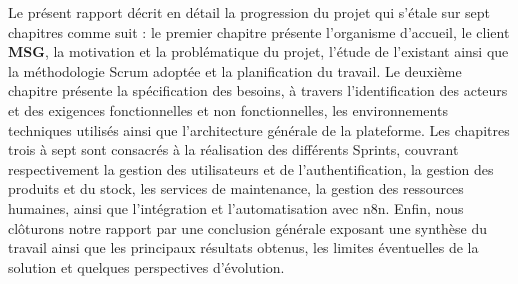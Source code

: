 Le présent rapport décrit en détail la progression du projet qui s'étale sur sept chapitres comme suit : le premier chapitre présente l'organisme d'accueil, le client \textbf{MSG}, la motivation et la problématique du projet, l'étude de l'existant ainsi que la méthodologie Scrum adoptée et la planification du travail. Le deuxième chapitre présente la spécification des besoins, à travers l'identification des acteurs et des exigences fonctionnelles et non fonctionnelles, les environnements techniques utilisés ainsi que l'architecture générale de la plateforme. Les chapitres trois à sept sont consacrés à la réalisation des différents Sprints, couvrant respectivement la gestion des utilisateurs et de l'authentification, la gestion des produits et du stock, les services de maintenance, la gestion des ressources humaines, ainsi que l'intégration et l'automatisation avec n8n. Enfin, nous clôturons notre rapport par une conclusion générale exposant une synthèse du travail ainsi que les principaux résultats obtenus, les limites éventuelles de la solution et quelques perspectives d'évolution.